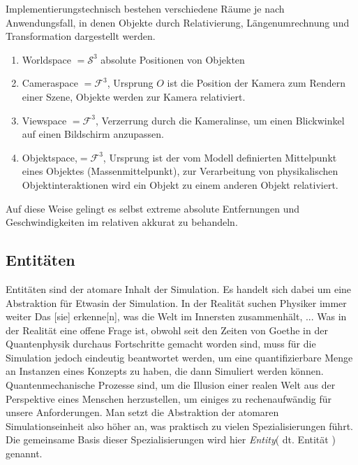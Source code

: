 Implementierungstechnisch bestehen verschiedene Räume je nach Anwendungsfall, in denen Objekte durch Relativierung, Längenumrechnung und Transformation dargestellt werden.

\begin{enumerate}
\item Worldspace $= \mathcal{S}^3$ absolute Positionen von Objekten
\item Cameraspace $= \mathcal{F}^3$, Ursprung $O$ ist die Position der Kamera zum Rendern einer Szene, Objekte werden zur Kamera relativiert.
\item Viewspace $= \mathcal{F}^3$, Verzerrung durch die Kameralinse, um einen Blickwinkel auf einen Bildschirm anzupassen.
\item Objektspace,$= \mathcal{F}^3$, Ursprung ist der vom Modell definierten Mittelpunkt eines Objektes (Massenmittelpunkt), zur Verarbeitung von physikalischen Objektinteraktionen wird ein Objekt zu einem anderen Objekt relativiert.
\end{enumerate}

Auf diese Weise gelingt es selbst extreme absolute Entfernungen und Geschwindigkeiten im relativen akkurat zu behandeln.

\subsection{Entitäten}
\label{sec:entity}
Entitäten sind der atomare Inhalt der Simulation. Es handelt sich dabei um eine Abstraktion für \glqq Etwas\grqq  in der Simulation. In der Realität suchen Physiker immer weiter \glqq Das [sie] erkenne[n], was die Welt im Innersten zusammenhält, ... Was in der Realität eine offene Frage ist, obwohl seit den Zeiten von Goethe in der Quantenphysik durchaus Fortschritte gemacht worden sind, muss für die Simulation jedoch eindeutig beantwortet werden, um eine quantifizierbare Menge an Instanzen eines Konzepts zu haben, die dann Simuliert werden können.\\
Quantenmechanische Prozesse sind, um die Illusion einer realen Welt aus der Perspektive eines Menschen herzustellen, um einiges zu rechenaufwändig für unsere Anforderungen. Man setzt die Abstraktion der atomaren Simulationseinheit also höher an, was praktisch zu vielen Spezialisierungen führt. Die gemeinsame Basis dieser Spezialisierungen wird hier \textit{Entity}( dt. Entität ) genannt.\\

